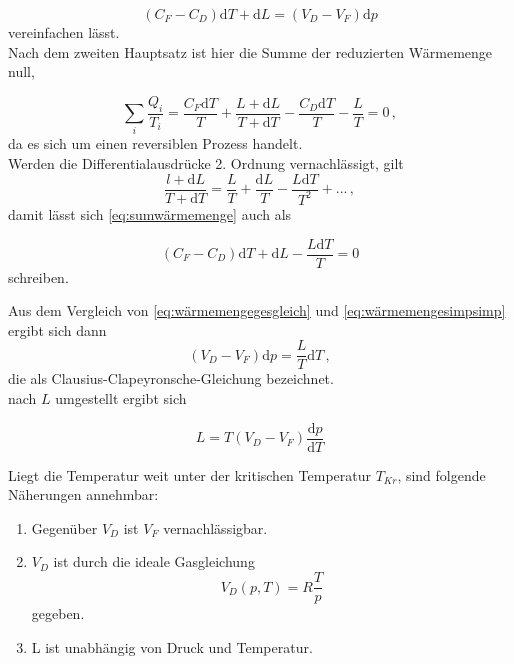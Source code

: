 \begin{equation}
    (C_F - C_D) \mathrm{d}T + \mathrm{d}L = (V_D - V_F) \mathrm{d}p
    \label{eq:wärmemengegesgleich}
\end{equation} vereinfachen lässt. \\

Nach dem zweiten Hauptsatz ist hier die Summe der reduzierten Wärmemenge null,

\begin{equation}
    \sum_i \frac{Q_i}{T_i} = \frac{C_F \mathrm{d}T}{T} + \frac{L + \mathrm{d}L}{T + \mathrm{d}T} - \frac{C_D \mathrm{d}T}{T} - \frac{L}{T} = 0 \,,
    \label{eq:sumwärmemenge}
\end{equation} da es sich um einen reversiblen Prozess handelt. \\

Werden die Differentialausdrücke 2. Ordnung vernachlässigt, gilt
\begin{equation}
    \frac{l + \mathrm{d}L}{T + \mathrm{d}T} = \frac{L}{T} + \frac{\mathrm{d}L}{T} - \frac{L \mathrm{d}T}
    {T^2} + ... \,,
    \label{eq:sumwärmemengesimp}
\end{equation} damit lässt sich \eqref{eq:sumwärmemenge} auch als

\begin{equation}
    (C_F - C_D) \mathrm{d}T + \mathrm{d}L - \frac{L \mathrm{d}T}{T} = 0 
    \label{eq:wärmemengesimpsimp}
\end{equation} schreiben.

Aus dem Vergleich von \eqref{eq:wärmemengegesgleich} und \eqref{eq:wärmemengesimpsimp} ergibt sich dann
\begin{equation}
    (V_D - V_F) \mathrm{d}p = \frac{L}{T} \mathrm{d}T \,,
    \label{eq:clausiusclapeyronschegleichung}
\end{equation} die als Clausius-Clapeyronsche-Gleichung bezeichnet. \\

nach $L$ umgestellt ergibt sich

\begin{equation}
    L = T(V_D - V_F) \frac{\mathrm{d}p}{\mathrm{d}T}
    \label{eq:clauclapL}
\end{equation}

Liegt die Temperatur weit unter der kritischen Temperatur $T_{Kr}$, sind folgende Näherungen annehmbar:
\begin{enumerate}
    \item Gegenüber $V_D$ ist $V_F$ vernachlässigbar.
    \item $V_D$ ist durch die ideale Gasgleichung 
    \begin{equation}
        V_D(p,T) = R \frac{T}{p}
    \end{equation} gegeben.
    \item L ist unabhängig von Druck und Temperatur.
\end{enumerate}

